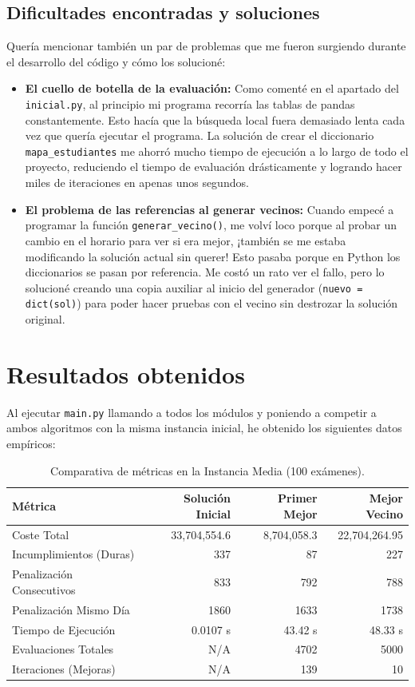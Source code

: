 \documentclass[12pt]{article}
\begin{document}
\subsection{Dificultades encontradas y soluciones}
Quería mencionar también un par de problemas que me fueron surgiendo durante el desarrollo del código y cómo los solucioné:
\begin{itemize}
    \item \textbf{El cuello de botella de la evaluación:} Como comenté en el apartado del \texttt{inicial.py}, al principio mi programa recorría las tablas de pandas constantemente. Esto hacía que la búsqueda local fuera demasiado lenta cada vez que quería ejecutar el programa. La solución de crear el diccionario \texttt{mapa\_estudiantes} me ahorró mucho tiempo de ejecución a lo largo de todo el proyecto, reduciendo el tiempo de evaluación drásticamente y logrando hacer miles de iteraciones en apenas unos segundos.
    \item \textbf{El problema de las referencias al generar vecinos:} Cuando empecé a programar la función \texttt{generar\_vecino()}, me volví loco porque al probar un cambio en el horario para ver si era mejor, ¡también se me estaba modificando la solución actual sin querer! Esto pasaba porque en Python los diccionarios se pasan por referencia. Me costó un rato ver el fallo, pero lo solucioné creando una copia auxiliar al inicio del generador (\texttt{nuevo = dict(sol)}) para poder hacer pruebas con el vecino sin destrozar la solución original.
\end{itemize}

\section{Resultados obtenidos}
Al ejecutar \texttt{main.py} llamando a todos los módulos y poniendo a competir a ambos algoritmos con la misma instancia inicial, he obtenido los siguientes datos empíricos:

\begin{table}[H]
\centering
\begin{tabular}{lrrr}
\toprule
\textbf{Métrica} & \textbf{Solución Inicial} & \textbf{Primer Mejor} & \textbf{Mejor Vecino} \\
\midrule
Coste Total & 33,704,554.6 & 8,704,058.3 & 22,704,264.95 \\
Incumplimientos (Duras) & 337 & 87 & 227 \\
Penalización Consecutivos & 833 & 792 & 788 \\
Penalización Mismo Día & 1860 & 1633 & 1738 \\
Tiempo de Ejecución & 0.0107 s & 43.42 s & 48.33 s \\
Evaluaciones Totales & N/A & 4702 & 5000 \\
Iteraciones (Mejoras) & N/A & 139 & 10 \\
\bottomrule
\end{tabular}
\caption{Comparativa de métricas en la Instancia Media (100 exámenes).}
\end{table}
\end{document}

